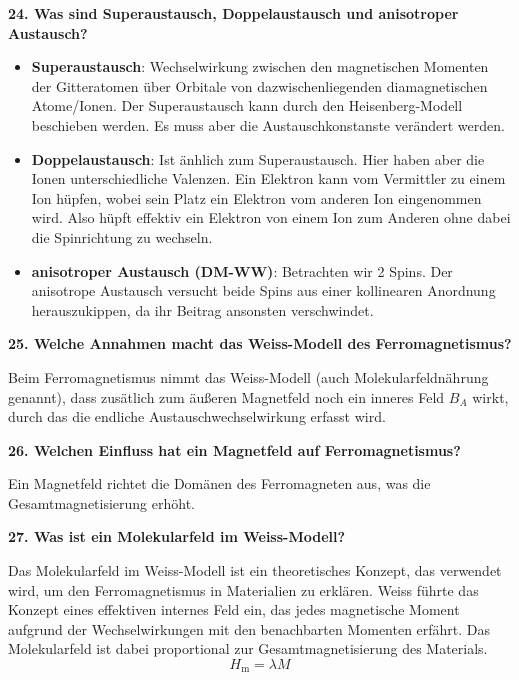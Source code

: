 \noindent\textbf{24. Was sind Superaustausch, Doppelaustausch und anisotroper Austausch?}\\
\begin{itemize}
    \item \textbf{Superaustausch}: Wechselwirkung zwischen den magnetischen Momenten der Gitteratomen über Orbitale von dazwischenliegenden diamagnetischen Atome/Ionen. Der Superaustausch kann durch den Heisenberg-Modell beschieben werden. Es muss aber die Austauschkonstanste verändert werden.
    \item \textbf{Doppelaustausch}: Ist änhlich zum Superaustausch. Hier haben aber die Ionen unterschiedliche Valenzen. Ein Elektron kann vom Vermittler zu einem Ion hüpfen, wobei sein Platz ein Elektron vom anderen Ion eingenommen wird. Also hüpft effektiv ein Elektron von einem Ion zum Anderen ohne dabei die Spinrichtung zu wechseln.
    \item \textbf{anisotroper Austausch (DM-WW)}: Betrachten wir 2 Spins. Der anisotrope Austausch versucht beide Spins aus einer kollinearen Anordnung herauszukippen, da ihr Beitrag ansonsten verschwindet.
\end{itemize}

\noindent\textbf{25. Welche Annahmen macht das Weiss-Modell des Ferromagnetismus?}\\
\begin{addmargin}[25pt]{0pt}
Beim Ferromagnetismus nimmt das Weiss-Modell (auch Molekularfeldnährung genannt), dass zusätlich zum äußeren Magnetfeld noch ein inneres Feld $B_{A}$ wirkt, durch das die endliche Austauschwechselwirkung erfasst wird.\\
\end{addmargin}

\noindent\textbf{26. Welchen Einfluss hat ein Magnetfeld auf Ferromagnetismus?}\\
\begin{addmargin}[25pt]{0pt}
Ein Magnetfeld richtet die Domänen des Ferromagneten aus, was die Gesamtmagnetisierung erhöht.\\
\end{addmargin}

\noindent\textbf{27. Was ist ein Molekularfeld im Weiss-Modell?}\\
\begin{addmargin}[25pt]{0pt}
Das Molekularfeld im Weiss-Modell ist ein theoretisches Konzept, das verwendet wird, um den Ferromagnetismus in Materialien zu erklären. Weiss führte das Konzept eines effektiven internes Feld ein, das jedes magnetische Moment aufgrund der Wechselwirkungen mit den benachbarten Momenten erfährt. Das Molekularfeld ist dabei proportional zur Gesamtmagnetisierung des Materials.
\begin{equation}
    H_{\text{m}} = \lambda M
    \label{eq:Weiss-Feld}
\end{equation}\\
\end{addmargin}

